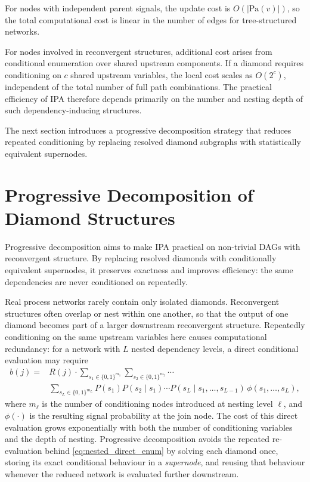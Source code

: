 \documentclass[preprint,12pt]{elsarticle}
\begin{document}
For nodes with independent parent signals, the update cost is $O(|\text{Pa}(v)|)$, so the total computational cost is linear in the number of edges for tree-structured networks.

For nodes involved in reconvergent structures, additional cost arises from conditional enumeration over shared upstream components. If a diamond requires conditioning on $c$ shared upstream variables, the local cost scales as $O(2^c)$, independent of the total number of full path combinations. The practical efficiency of IPA therefore depends primarily on the number and nesting depth of such dependency-inducing structures.

The next section introduces a progressive decomposition strategy that reduces repeated conditioning by replacing resolved diamond subgraphs with statistically equivalent supernodes.


\section{Progressive Decomposition of Diamond Structures}\label{sec:decomp}
Progressive decomposition aims to make IPA practical on non-trivial DAGs with reconvergent structure. By replacing resolved diamonds with conditionally equivalent supernodes, it preserves exactness and improves efficiency: the same dependencies are never conditioned on repeatedly.

Real process networks rarely contain only isolated diamonds. Reconvergent structures often overlap or nest within one another, so that the output of one diamond becomes part of a larger downstream reconvergent structure. Repeatedly conditioning on the same upstream variables here causes computational redundancy: for a network with $L$ nested dependency levels, a direct conditional evaluation may require
\begin{align}
b(j) = & R(j) \cdot
\sum_{s_1 \in \{0,1\}^{m_1}}
\sum_{s_2 \in \{0,1\}^{m_2}}
\cdots \nonumber \\
&
\sum_{s_L \in \{0,1\}^{m_L}}
P(s_1)P(s_2\mid s_1)\cdots P(s_L\mid s_1,\ldots,s_{L-1})
\,\phi(s_1,\ldots,s_L),
\label{eq:nested_direct_enum}
\end{align}
where $m_\ell$ is the number of conditioning nodes introduced at nesting level $\ell$, and $\phi(\cdot)$ is the resulting signal probability at the join node. The cost of this direct evaluation grows exponentially with both the number of conditioning variables and the depth of nesting. Progressive decomposition avoids the repeated re-evaluation behind \eqref{eq:nested_direct_enum} by solving each diamond once, storing its exact conditional behaviour in a \emph{supernode}, and reusing that behaviour whenever the reduced network is evaluated further downstream.
\end{document}
